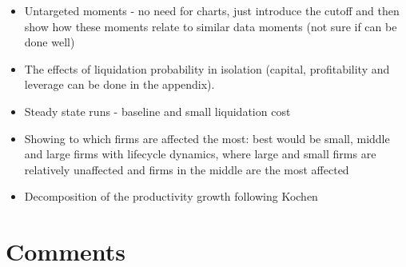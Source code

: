\documentclass[12pt]{article}
\begin{document}
\begin{itemize} \setlength\itemsep{0em}  \small
    \item Untargeted moments - no need for charts, just introduce the cutoff and then show how these moments relate to similar data moments (not sure if can be done well)
    \item The effects of liquidation probability in isolation (capital, profitability and leverage can be done in the appendix). 
    \item Steady state runs - baseline and small liquidation cost 
    \item Showing to which firms are affected the most: best would be small, middle and large firms with lifecycle dynamics, where large and small firms are relatively unaffected and firms in the middle are the most affected
    \item Decomposition of the productivity growth following Kochen
\end{itemize} \normalsize



\section*{Comments}
\end{document}
